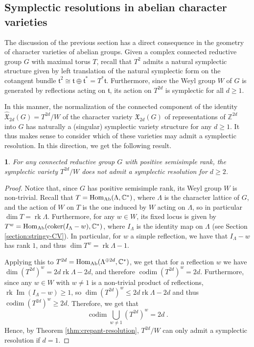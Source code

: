 \documentclass[11pt,english]{amsart}
\numberwithin{equation}{section}
\numberwithin{figure}{section}
\theoremstyle{plain}
\newtheorem{cor}[thm]{\protect\corollaryname}
\theoremstyle{plain}
\theoremstyle{definition}
\theoremstyle{remark}
\DeclareMathOperator{\image}{Im}
\newcommand{\ZZ}{\mathbb{Z}}
\newcommand{\CC}{\mathbb{C}}
\newcommand{\coker}{\operatorname{coker}}
\newcommand{\codim}{\operatorname{codim}}
\newcommand{\Hom}{\operatorname{Hom}}
\newcommand{\rk}{\operatorname{rk}}
\newcommand{\Ab}{\textup{Ab}}
\providecommand{\corollaryname}{Corollary}
\begin{document}
\subsection{Symplectic resolutions in abelian character varieties} \label{ssec:symplectic_resolutions}
The discussion of the previous section has a direct consequence in the geometry of character varieties of abelian groups. Given a complex connected reductive group $G$ with maximal torus $T$, recall that $T^2$ admits a natural symplectic structure given by left translation of the natural symplectic form on the cotangent bundle $\mathfrak{t}^2 \cong \mathfrak{t} \oplus \mathfrak{t}^* = T^*\mathfrak{t}$. Furthermore, since the Weyl group $W$ of $G$ is generated by reflections acting on $\mathfrak{t}$, its action on $T^{2d}$ is symplectic for all $d \geq 1$.

In this manner, the normalization of the connected component of the identity $\hat{\mathfrak{X}}_{2d}(G) = T^{2d}/W$ of the character variety $\mathfrak{X}_{2d}(G)$ of representations of $\ZZ^{2d}$ into $G$ has naturally a (singular) symplectic variety structure for any $d \geq 1$. It thus makes sense to consider which of these varieties may admit a symplectic resolution. In this direction, we get the following result. 

\begin{cor}\label{cor:existence-crepant}
For any connected reductive group $G$ with positive semisimple rank, the symplectic variety $T^{2d}/W$ does not admit a symplectic resolution for $d \geq 2$.
\end{cor}

\begin{proof}
Notice that, since $G$ has positive semisimple rank, its Weyl group $W$ is non-trivial. 
Recall that $T = \Hom_{\Ab}(\Lambda, \CC^*)$, where $\Lambda$ is the character lattice of $G$, and the action of $W$ on $T$ is the one induced by $W$ acting on $\Lambda$, so in particular $\dim T = \rk \Lambda$. Furthermore, for any $w \in W$, its fixed locus is given by $T^w = \Hom_{\Ab}(\coker(I_\Lambda - w), \CC^*)$, where $I_\Lambda$ is the identity map on $\Lambda$ (see Section \ref{section:stringy-CV}). In particular, for $w$ a simple reflection, we have that $I_{\Lambda} - w$ has rank $1$, and thus $\dim T^w = \rk \Lambda - 1$.

Applying this to $T^{2d} = \Hom_{\Ab}(\Lambda^{\oplus 2d}, \CC^*)$, we get that for a reflection $w$ we have $\dim (T^{2d})^w = 2d \rk \Lambda - 2d$, and therefore $\codim (T^{2d})^w = 2d$. Furthermore, since any $w \in W$ with $w \neq 1$ is a non-trivial product of reflections, $\rk \image(I_\Lambda - w) \geq 1$, so $\dim (T^{2d})^w \leq 2d \rk \Lambda - 2d$ and thus $\codim (T^{2d})^w \geq 2d$. Therefore, we get that
$$
	\codim \bigcup_{w \neq 1} (T^{2d})^w = 2d\; .
$$
Hence, by Theorem \ref{thm:crepant-resolution}, $T^{2d}/W$ can only admit a symplectic resolution if $d=1$.
\end{proof}
\end{document}
